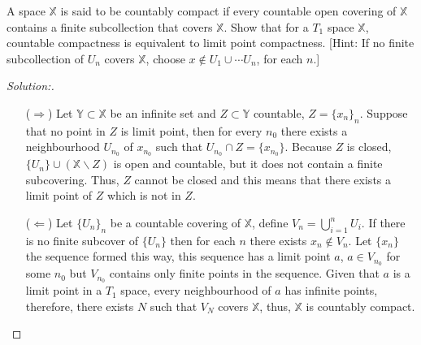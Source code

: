 \documentclass[a4paper,12pt, reqno]{article}
\theoremstyle{definition}
\newenvironment{exerr}[1]{
  \renewcommand\theexeralt{#1}
  \exeralt
}{\endexeralt}
\newenvironment{solution}{\begin{proof}[Solution:]}{\end{proof}}
\newcommand{\X}{\mathbb{X}}
\newcommand{\Y}{\mathbb{Y}}
\begin{document}
\begin{exerr}{4}
  A space $\X$ is said to be countably compact if every countable open covering of $\X$ contains a finite subcollection that covers $\X$. Show that for a $T_{1}$ space $\X$, countable compactness is equivalent to limit point compactness. [Hint: If no finite subcollection of $U_{n}$ covers $\X$, choose $x\notin U_{1}\cup\cdots U_{n}$, for each $n$.]
\end{exerr}
\begin{solution}\hfill
  \begin{itemize}
    \item[($\Longrightarrow$)] Let $\Y\subset\X$ be an infinite set and $Z\subset\Y$ countable, $Z =\{ x_{n} \}_{n}$. Suppose that no point in $Z$ is limit point, then for every $n_{0}$ there exists a neighbourhood $U_{n_{0}}$ of $x_{n_{0}}$ such that $U_{n_{0}}\cap Z = \{ x_{n_{0}} \}$. Because $Z$ is closed, $\{ U_{n} \}\cup(\X\backslash Z)$ is open and countable, but it does not contain a finite subcovering. Thus, $Z$ cannot be closed and this means that there exists a limit point of $Z$ which is not in $Z$.
    \item[($\Longleftarrow$)] Let $\{ U_{n} \}_{n}$ be a countable covering of $\X$, define $V_{n} = \bigcup_{i=1}^n U_{i}$. If there is no finite subcover of $\{ U_{n} \}$ then for each $n$ there exists $x_{n}\notin V_{n}$. Let $\{ x_{n} \}$ the sequence formed this way, this sequence has a limit point $a$, $a\in V_{n_{0}}$ for some $n_{0}$ but $V_{n_{0}}$ contains only finite points in the sequence. Given that $a$ is a limit point in a $T_{1}$ space, every neighbourhood of $a$ has infinite points, therefore, there exists $N$ such that $V_{N}$ covers $\X$, thus, $\X$ is countably compact.
  \end{itemize}
\end{solution}
\end{document}

